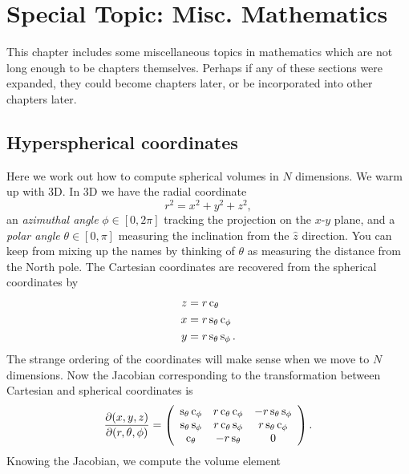 \chapter{Special Topic: Misc. Mathematics}\label{ap:spec_math}

This chapter includes some miscellaneous topics in mathematics which are
not long enough to be chapters themselves. Perhaps if any of these sections
were expanded, they could become chapters later, or be incorporated into
other chapters later.


\section{Hyperspherical coordinates}

Here we work out how to compute spherical volumes in $N$ dimensions. 
We warm up with 3D. In 3D we have the radial coordinate
\begin{equation}
  r^2=x^2+y^2+z^2,
\end{equation}
an {\it azimuthal angle} $\phi\in[0,2\pi]$ tracking the projection
on the $x$-$y$ plane, and a {\it polar angle} $\theta\in[0,\pi]$ measuring
the inclination from the $\hat{z}$ direction. 
You can keep from mixing up the
names by thinking of $\theta$ as measuring the distance from the North pole.
The Cartesian coordinates are recovered from the spherical coordinates by
\begin{equation}
  \begin{aligned}
    z&=r\operatorname{c}_\theta\\
    x&=r\operatorname{s}_\theta\operatorname{c}_\phi\\
    y&=r\operatorname{s}_\theta\operatorname{s}_\phi.
  \end{aligned}
\end{equation}
The strange ordering of the coordinates will make sense when we move
to $N$ dimensions. Now the Jacobian corresponding to the transformation between 
Cartesian and spherical coordinates is
\begin{equation}
  \pdv{(x,y,z)}{(r,\theta,\phi)}
  =\left(\begin{array}{ccc}
     \operatorname{s}_\theta\operatorname{c}_\phi & r\operatorname{c}_\theta\operatorname{c}_\phi & -r\operatorname{s}_\theta\operatorname{s}_\phi \\
     \operatorname{s}_\theta\operatorname{s}_\phi  & r\operatorname{c}_\theta\operatorname{s}_\phi  & r\operatorname{s}_\theta\operatorname{c}_\phi \\
     \operatorname{c}_\theta        & -r\operatorname{s}_\theta         & 0                  \\ 
   \end{array}\right).
\end{equation}
Knowing the Jacobian, we compute the volume element
